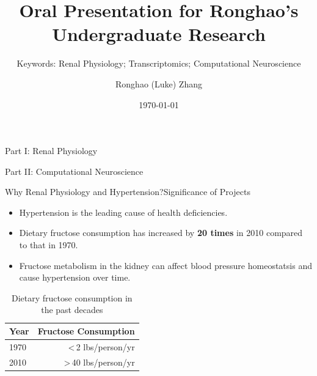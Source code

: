 \documentclass[
11pt,notheorems,hyperref={pdfauthor=whatever}
]{beamer}
\title[
]{Oral Presentation for Ronghao's Undergraduate Research}
\subtitle{Keywords: Renal Physiology; Transcriptomics; Computational Neuroscience}
\author[
]{
    Ronghao (Luke) Zhang
}
\institute{
    Department of Physiology and Biophysics, \\
    School of Medicine, \\
    Case Western Reserve University}
\date{\today}
\begin{document}
{
\begin{frame}
  \titlepage
\end{frame}
}
\addtocounter{framenumber}{-1}

\begin{frame}{Part I: Renal Physiology}
    \tableofcontents[part=1]
\end{frame}
\begin{frame}{Part II: Computational Neuroscience}
    \tableofcontents[part=2]
\end{frame}


\begin{frame}{Why Renal Physiology and Hypertension?}{Significance of Projects}
    \begin{itemize}
        \item Hypertension is the leading cause of health deficiencies.
        \item Dietary fructose consumption has increased by \textbf{20 times} in 2010 compared to that in 1970. 
        \item Fructose metabolism in the kidney can affect blood pressure homeostatsis and cause hypertension over time. 
    \end{itemize}
    \begin{table}
        \renewcommand{\tablename}{Table 1}
        \caption{Dietary fructose consumption in the past decades}
        \begin{tabular}{@{} lr @{}}
          \toprule
          Year & Fructose Consumption \\
          \midrule
          1970 & <\,2 lbs/person/yr\\
          2010 & >\,40 lbs/person/yr\\
          \bottomrule
        \end{tabular}
    \end{table}
\end{frame}

\end{document}
